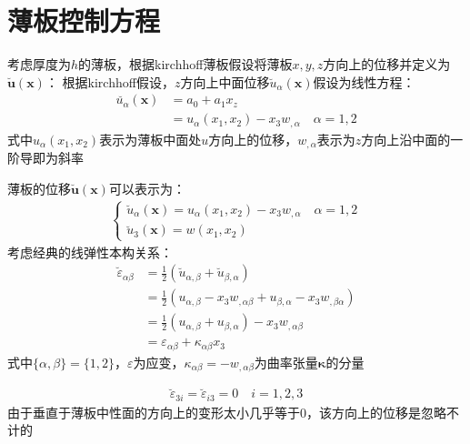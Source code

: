 \documentclass[engineeringmaster]{hquThesis}
\begin{document}
\section{薄板控制方程}
考虑厚度为$h$的薄板，根据kirchhoff薄板假设将薄板$x,y,z$方向上的位移并定义为$\breve{\pmb{u}}(\pmb{x})$：
根据kirchhoff假设，$z$方向上中面位移$\breve{u}_{\alpha}(\pmb{x})$假设为线性方程：
\begin{equation}
\begin{split}
\breve{u_\alpha}(\pmb{x})&=a_0+a_1x_z\\
&=u_{\alpha}(x_1,x_2)-x_3w_{,\alpha}\quad \alpha=1,2
\end{split}
\end{equation}
式中$u_{\alpha}(x_1,x_2)$表示为薄板中面处$u$方向上的位移，$w_{,\alpha}$表示为$z$方向上沿中面的一阶导即为斜率\par
薄板的位移$\breve{\pmb{u}}(\pmb{x})$可以表示为：
\begin{equation}
\begin{split}
\begin{cases}
    \breve{u}_{\alpha}(\pmb{x})=u_{\alpha}(x_1,x_2)-x_3w_{,\alpha}\quad \alpha=1,2\\
    \breve{u}_3(\pmb{x})=w(x_1,x_2)
\end{cases}
\end{split}
\end{equation}
考虑经典的线弹性本构关系：
\begin{equation}
\begin{split}
    \breve{\varepsilon}_{\alpha\beta}&=\frac{1}{2}(\breve{u}_{\alpha,\beta}+\breve{u}_{\beta,\alpha})\\
    &=\frac{1}{2}(u_{\alpha,\beta}-x_3w_{,\alpha\beta}+u_{\beta,\alpha}-x_3w_{,\beta\alpha})\\
    &=\frac{1}{2}(u_{\alpha,\beta}+u_{\beta,\alpha})-x_3w_{,\alpha\beta}\\
    &=\varepsilon_{\alpha\beta}+\kappa_{\alpha\beta}x_3 
\end{split}
\end{equation}
式中$\{\alpha,\beta\}=\{1,2\}$，$\varepsilon$为应变，$\kappa_{\alpha\beta}=-w_{,\alpha\beta}$为曲率张量$\pmb{\kappa}$的分量\par
\begin{equation}
\begin{split}
    \breve{\varepsilon}_{3i}=\breve{\varepsilon}_{i3}=0 \quad i=1,2,3
\end{split}
\end{equation}
由于垂直于薄板中性面的方向上的变形太小几乎等于0，该方向上的位移是忽略不计的\par
\end{document}
